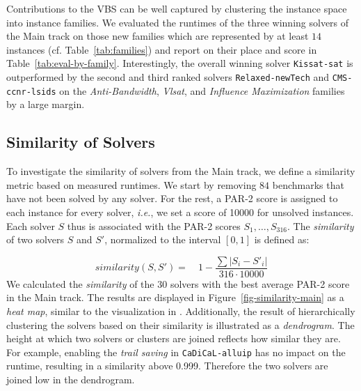 \documentclass{elsarticle}
\newcommand{\solver}[1]{\texttt{#1}}
\begin{document}
Contributions to the VBS can be well captured by clustering the instance space into instance families. 
We evaluated the runtimes of the three winning solvers of the Main track on those new families which are represented by at least $14$ instances (cf. Table~\ref{tab:families}) and report on their place and score in Table~\ref{tab:eval-by-family}. 
Interestingly, the overall winning solver \solver{Kissat-sat} is outperformed by the second and third ranked solvers \solver{Relaxed-newTech} and \solver{CMS-ccnr-lsids} on the \emph{Anti-Bandwidth}, \emph{Vlsat}, and \emph{Influence Maximization} families by a large margin. 

\subsection{Similarity of Solvers}
To investigate the similarity of solvers from the Main track, we define a
similarity metric based on measured runtimes. We start by removing $84$
benchmarks that have not been solved by any solver. For the rest, a PAR-2 score
is assigned to each instance for every solver,
\emph{i.e.}, we set a score of \num{10000} for unsolved instances.
Each solver $S$ thus is associated with the PAR-2 scores $S_{1},\dots,S_{316}$.
The \emph{similarity} of two solvers $S$
and $S'$, normalized to the interval $[0,1]$ is defined
as:

\[
	similarity(S, S') =\quad 1 - \frac{\sum{|S_{i} - S'_{i}|}}{316 \cdot \num{10000}}
\]
We calculated the \emph{similarity} of the $30$ solvers with the
best average PAR-2 score in the Main track. The results are displayed in
Figure~\ref{fig-similarity-main} as a \emph{heat map}, similar to the visualization in \cite{Balyo:2015:SATRace}. Additionally, the result
of hierarchically clustering the solvers based on their similarity is
illustrated as a \emph{dendrogram}. The height at which two solvers or clusters
are joined reflects how similar they are. For example, enabling the \emph{trail
  saving} in \solver{CaDiCaL-alluip} has no impact on the runtime, resulting in
a similarity above \num{0.999}. Therefore the two solvers are joined low in the
dendrogram.
\end{document}
